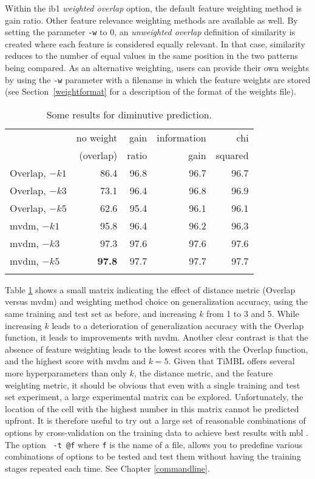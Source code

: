 \documentclass{report}
\begin{document}
Within the {\sc ib1} {\em weighted overlap}\/ option, the default
feature weighting method is gain ratio. Other feature relevance
weighting methods are available as well.  By setting the parameter
{\tt -w} to 0, an {\em unweighted overlap}\/ definition of similarity is created
where each feature is considered equally relevant. In that case, similarity reduces
to the number of equal values in the same position in the
two patterns being compared. As an alternative weighting, users can
provide their own weights by using the {\tt -w} parameter with a
filename in which the feature weights are stored (see
Section~\ref{weightformat} for a description of the format of the
weights file).

\begin{table}
\begin{center}
\begin{tabular}{l|rrrr}
             & no weight & gain  & information & chi    \\
             & (overlap) & ratio & gain        & squared \\
\noalign{\smallskip}
\hline
\noalign{\smallskip}
Overlap,  $-k1$ & 86.4 & 96.8 & 96.7 & 96.7 \\
Overlap,  $-k3$ & 73.1 & 96.4 & 96.8 & 96.9 \\
Overlap,  $-k5$ & 62.6 & 95.4 & 96.1 & 96.1 \\
\hline
\noalign{\smallskip}
{\sc mvdm}, $-k1$ & 95.8 & 96.4 & 96.2 & 96.3 \\
{\sc mvdm}, $-k3$ & 97.3 & 97.6 & 97.6 & 97.6 \\
{\sc mvdm}, $-k5$ & {\bf 97.8} & 97.7 & 97.7 & 97.7 \\
\hline
\noalign{\smallskip}
\end{tabular}
\caption{Some results for diminutive prediction.}
\label{diminresults}
\end{center}
\end{table}

Table \ref{diminresults} shows a small matrix indicating the effect of distance metric (Overlap versus {\sc mvdm}) and weighting method choice on generalization accuracy, using the same training and test set as before, and increasing $k$ from 1 to 3 and 5. While increasing $k$ leads to a deterioration of generalization accuracy with the Overlap function, it leads to improvements with {\sc mvdm}. Another clear contrast is that the absence of feature weighting leads to the lowest scores with the Overlap function, and the highest score with {\sc mvdm} and $k=5$. Given that TiMBL offers several more hyperparameters than only $k$, the distance metric, and the feature weighting metric, it should be obvious that even with a single training and test set experiment, a large experimental matrix can be explored. Unfortunately, the location of the cell with the highest number in this matrix cannot be predicted upfront. It is therefore useful to try out a large set of reasonable combinations of options by cross-validation on the training data to achieve best results with {\sc mbl} \cite{VandenBosch04b}. The option {\tt
  -t @f} where {\tt f} is the name of a file, allows you to predefine various combinations of options to be tested and test them without having the training stages repeated each time. See Chapter \ref{commandline}.
\end{document}
